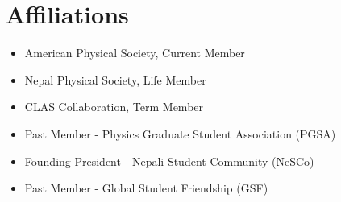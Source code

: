 \documentclass[10pt, letterpaper]{article}
\newcommand{\years}[1]{\marginnote{\small #1}} %
\begin{document}
\section*{Affiliations}
\noindent
\begin{itemize}
  \item American Physical Society, Current Member 
  \item Nepal Physical Society, Life Member %
  \item CLAS Collaboration, Term Member %
  \item Past Member - Physics Graduate Student Association (PGSA)
  \item Founding President - Nepali Student Community (NeSCo)
  \item Past Member - Global Student Friendship (GSF)
\end{itemize}

\end{document}
